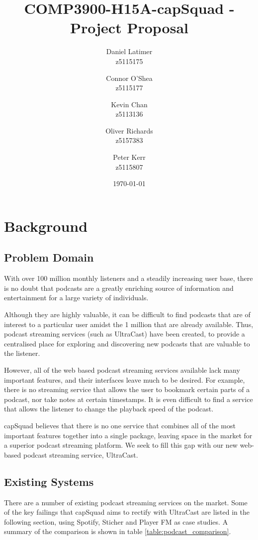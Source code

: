 \documentclass[12pt]{article}
\title{COMP3900-H15A-capSquad - Project Proposal}
\date{\today}
\author{
    Daniel Latimer \\ z5115175 \and
    Connor O'Shea \\ z5115177 \and
    Kevin Chan \\ z5113136 \and
    Oliver Richards \\ z5157383 \and
    Peter Kerr \\ z5115807}
\begin{document}
\maketitle
\tableofcontents
\newpage

\section{Background}
\subsection{Problem Domain}
With over 100 million monthly listeners\cite{musicoomph} and a steadily increasing user base, there is no doubt that podcasts are a greatly enriching source of information and entertainment for a large variety of individuals.

Although they are highly valuable, it can be difficult to find podcasts that are of interest to a particular user amidst the 1 million\cite{musicoomph} that are already available.
Thus, podcast streaming services (such as UltraCast) have been created, to provide a centralised place for exploring and discovering new podcasts that are valuable to the listener.

However, all of the web based podcast streaming services available lack many important features, and their interfaces leave much to be desired. For example, there is no streaming service that allows the user to bookmark certain parts of a podcast, nor take notes at certain timestamps. It is even difficult to find a service that allows the listener to change the playback speed of the podcast.

capSquad believes that there is no one service that combines all of the most important features together into a single package, leaving space in the market for a superior podcast streaming platform. We seek to fill this gap with our new web-based podcast streaming service, UltraCast.

\subsection{Existing Systems}
There are a number of existing podcast streaming services on the market. Some of the key failings that capSquad aims to rectify with UltraCast are listed in the following section, using Spotify\cite{spotify}, Sticher\cite{sticher} and Player FM\cite{player_fm} as case studies.
A summary of the comparison is shown in table \ref{table:podcast_comparison}.
\end{document}

